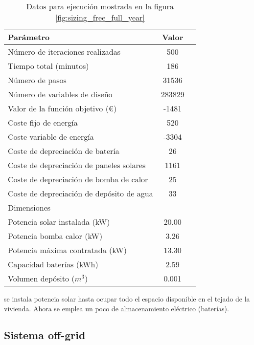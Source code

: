 \begin{table}[ht]
	\centering
	\caption{Datos para ejecución mostrada en la figura \ref{fig:sizing_free_full_year}}
	\label{tab:sizing_free_full_year}
	\begin{tabular}{@{}lcc@{}}
		\toprule
		Parámetro                                 & Valor  \\
		\midrule
		Número de iteraciones realizadas          & 500    \\
		Tiempo total (minutos)                    & 186    \\
		Número de pasos                           & 31536  \\
		Número de variables de diseño             & 283829 \\
		\midrule
		Valor de la función objetivo (€)          & -1481  \\
		\midrule
		Coste fijo de energía                     & 520    \\
		Coste variable de energía                 & -3304  \\
		Coste de depreciación de batería          & 26     \\
		Coste de depreciación de paneles solares  & 1161   \\
		Coste de depreciación de bomba de calor   & 25     \\
		Coste de depreciación de depósito de agua & 33     \\
		\midrule
		Dimensiones                               &        \\
		\midrule
		Potencia solar instalada (kW)             & 20.00  \\
		Potencia bomba calor (kW)                 & 3.26   \\
		Potencia máxima contratada (kW)           & 13.30  \\
		Capacidad baterías (kWh)                  & 2.59   \\
		Volumen depósito ($m^3$)                  & 0.001  \\
		\bottomrule
	\end{tabular}
\end{table}

se instala potencia solar hasta ocupar todo el espacio disponible en el tejado
de la vivienda. Ahora se emplea un poco de almacenamiento eléctrico (baterías).


\clearpage
\subsection{Sistema off-grid}

